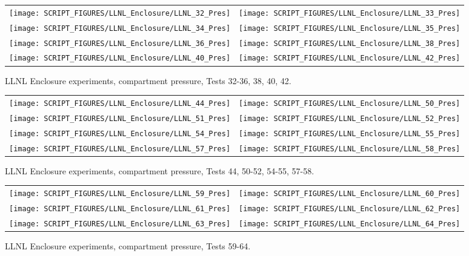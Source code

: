 \begin{figure}[p]
\begin{tabular*}{\textwidth}{l@{\extracolsep{\fill}}r}
\texttt{[image: SCRIPT\_FIGURES/LLNL\_Enclosure/LLNL\_32\_Pres]} &
\texttt{[image: SCRIPT\_FIGURES/LLNL\_Enclosure/LLNL\_33\_Pres]} \\
\texttt{[image: SCRIPT\_FIGURES/LLNL\_Enclosure/LLNL\_34\_Pres]} &
\texttt{[image: SCRIPT\_FIGURES/LLNL\_Enclosure/LLNL\_35\_Pres]} \\
\texttt{[image: SCRIPT\_FIGURES/LLNL\_Enclosure/LLNL\_36\_Pres]} &
\texttt{[image: SCRIPT\_FIGURES/LLNL\_Enclosure/LLNL\_38\_Pres]} \\
\texttt{[image: SCRIPT\_FIGURES/LLNL\_Enclosure/LLNL\_40\_Pres]} &
\texttt{[image: SCRIPT\_FIGURES/LLNL\_Enclosure/LLNL\_42\_Pres]}
\end{tabular*}
\caption{LLNL Enclosure experiments, compartment pressure, Tests 32-36, 38, 40, 42.}
\label{LLNL_Enclosure_Pres_4}
\end{figure}

\begin{figure}[p]
\begin{tabular*}{\textwidth}{l@{\extracolsep{\fill}}r}
\texttt{[image: SCRIPT\_FIGURES/LLNL\_Enclosure/LLNL\_44\_Pres]} &
\texttt{[image: SCRIPT\_FIGURES/LLNL\_Enclosure/LLNL\_50\_Pres]} \\
\texttt{[image: SCRIPT\_FIGURES/LLNL\_Enclosure/LLNL\_51\_Pres]} &
\texttt{[image: SCRIPT\_FIGURES/LLNL\_Enclosure/LLNL\_52\_Pres]} \\
\texttt{[image: SCRIPT\_FIGURES/LLNL\_Enclosure/LLNL\_54\_Pres]} &
\texttt{[image: SCRIPT\_FIGURES/LLNL\_Enclosure/LLNL\_55\_Pres]} \\
\texttt{[image: SCRIPT\_FIGURES/LLNL\_Enclosure/LLNL\_57\_Pres]} &
\texttt{[image: SCRIPT\_FIGURES/LLNL\_Enclosure/LLNL\_58\_Pres]}
\end{tabular*}
\caption{LLNL Enclosure experiments, compartment pressure, Tests 44, 50-52, 54-55, 57-58.}
\label{LLNL_Enclosure_Pres_5}
\end{figure}

\begin{figure}[p]
\begin{tabular*}{\textwidth}{l@{\extracolsep{\fill}}r}
\texttt{[image: SCRIPT\_FIGURES/LLNL\_Enclosure/LLNL\_59\_Pres]} &
\texttt{[image: SCRIPT\_FIGURES/LLNL\_Enclosure/LLNL\_60\_Pres]} \\
\texttt{[image: SCRIPT\_FIGURES/LLNL\_Enclosure/LLNL\_61\_Pres]} &
\texttt{[image: SCRIPT\_FIGURES/LLNL\_Enclosure/LLNL\_62\_Pres]} \\
\texttt{[image: SCRIPT\_FIGURES/LLNL\_Enclosure/LLNL\_63\_Pres]} &
\texttt{[image: SCRIPT\_FIGURES/LLNL\_Enclosure/LLNL\_64\_Pres]}
\end{tabular*}
\caption{LLNL Enclosure experiments, compartment pressure, Tests 59-64.}
\label{LLNL_Enclosure_Pres_6}
\end{figure}


